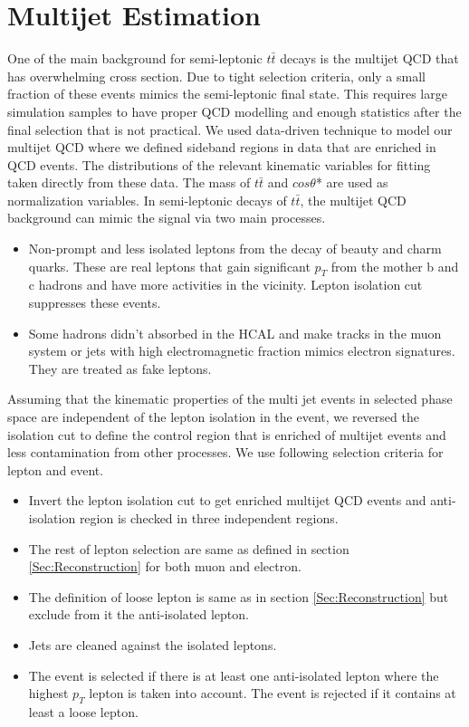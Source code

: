 \section{Multijet Estimation}\label{sec:multijet}
One of the main background for semi-leptonic $t\bar{t}$ decays is the multijet QCD that has overwhelming cross section. Due to tight selection criteria, only a small fraction of these events mimics the semi-leptonic final state. This requires large simulation samples to have proper QCD modelling and enough statistics after the final selection that is not practical. We used data-driven technique to model our multijet QCD where we defined sideband regions in data that are enriched in QCD events. The distributions of the relevant kinematic variables for fitting taken directly from these data. The mass of $t\bar{t}$ and $cos\theta$* are used as normalization variables. In semi-leptonic decays of $t\bar{t}$, the multijet QCD background can mimic the signal via two main processes.
\begin{itemize}
\item Non-prompt and less isolated leptons from the decay of beauty and charm quarks. These are real leptons that gain significant $p_{T}$ from the mother b and c hadrons and have more activities in the vicinity. Lepton isolation cut suppresses these events.
\item Some hadrons didn't absorbed in the HCAL and make tracks in the muon system or jets with high electromagnetic fraction mimics electron signatures. They are treated as fake leptons.
\end{itemize}
Assuming that the kinematic properties of the multi jet events in selected phase space are independent of the lepton isolation in the event, we reversed the isolation cut to define the control region that is enriched of multijet events and less contamination from other processes. We use following selection criteria for lepton and event.
\begin{itemize}
\item Invert the lepton isolation cut to get enriched multijet QCD events and anti-isolation region is checked in three independent regions.
\item The rest of lepton selection are same as defined in section \ref{Sec:Reconstruction} for both muon and electron.
\item The definition of loose lepton is same as in section \ref{Sec:Reconstruction} but exclude from it the anti-isolated lepton.
\item Jets are cleaned against the isolated leptons.
\item The event is selected if there is at least one anti-isolated lepton where the highest $p_{T}$ lepton is taken into account. The event is rejected if it contains at least a loose lepton.
\end{itemize}

